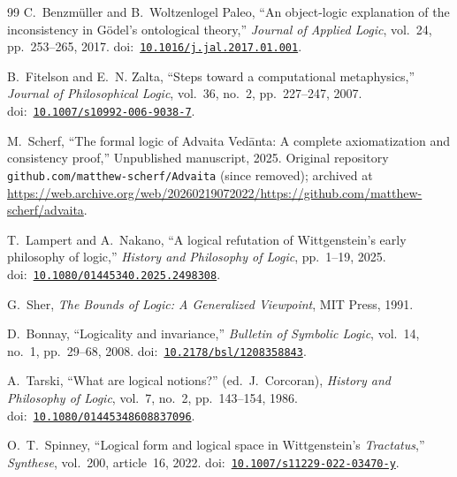 \documentclass[10pt, letterpaper]{article}
\theoremstyle{definition}
\theoremstyle{remark}
\begin{document}
\begin{thebibliography}{99}
C.~Benzm\"uller and B.~Woltzenlogel Paleo,
``An object-logic explanation of the inconsistency in G\"odel's
ontological theory,''
\emph{Journal of Applied Logic}, vol.~24, pp.~253--265, 2017.
\newline doi:~\href{https://doi.org/10.1016/j.jal.2017.01.001}{\texttt{10.1016/j.jal.2017.01.001}}.

B.~Fitelson and E.~N. Zalta,
``Steps toward a computational metaphysics,''
\emph{Journal of Philosophical Logic}, vol.~36, no.~2,
pp.~227--247, 2007.
\newline doi:~\href{https://doi.org/10.1007/s10992-006-9038-7}{\texttt{10.1007/s10992-006-9038-7}}.

M.~Scherf,
``The formal logic of Advaita Ved\=anta: A complete
axiomatization and consistency proof,''
Unpublished manuscript, 2025.
Original repository \texttt{github.com/matthew-scherf/Advaita}
(since removed); archived at
\url{https://web.archive.org/web/20260219072022/https://github.com/matthew-scherf/advaita}.

T.~Lampert and A.~Nakano,
``A logical refutation of Wittgenstein's early philosophy of
logic,''
\emph{History and Philosophy of Logic}, pp.~1--19, 2025.
\newline doi:~\href{https://doi.org/10.1080/01445340.2025.2498308}{\texttt{10.1080/01445340.2025.2498308}}.

G.~Sher,
\emph{The Bounds of Logic: A Generalized Viewpoint},
MIT Press, 1991.

D.~Bonnay,
``Logicality and invariance,''
\emph{Bulletin of Symbolic Logic}, vol.~14, no.~1, pp.~29--68,
2008.
\newline doi:~\href{https://doi.org/10.2178/bsl/1208358843}{\texttt{10.2178/bsl/1208358843}}.

A.~Tarski,
``What are logical notions?''
(ed.\ J.~Corcoran),
\emph{History and Philosophy of Logic}, vol.~7, no.~2,
pp.~143--154, 1986.
\newline doi:~\href{https://doi.org/10.1080/01445348608837096}{\texttt{10.1080/01445348608837096}}.

O.~T.~Spinney,
``Logical form and logical space in Wittgenstein's
\emph{Tractatus},''
\emph{Synthese}, vol.~200, article~16, 2022.
\newline doi:~\href{https://doi.org/10.1007/s11229-022-03470-y}{\texttt{10.1007/s11229-022-03470-y}}.


\end{thebibliography}
\end{document}
